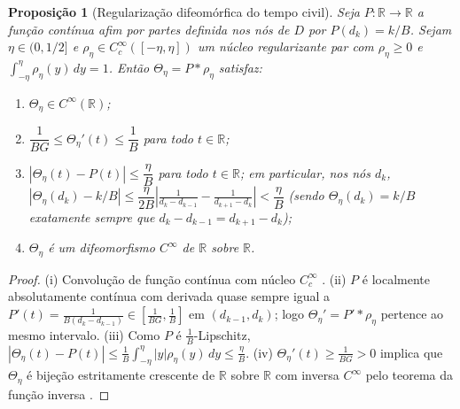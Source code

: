 \documentclass[11pt, a4paper]{article}
\theoremstyle{definition}
\theoremstyle{plain}
\newtheorem{proposicao}[definicao]{Proposição}
\theoremstyle{remark}
\begin{document}
\begin{proposicao}[Regularização difeomórfica do tempo civil]\label{prop:2.2}
Seja $P : \mathbb{R} \to \mathbb{R}$ a função contínua afim por partes definida nos nós de $D$ por $P(d_k) = k/B$. Sejam $\eta \in (0, 1/2]$ e $\rho_\eta \in C_c^\infty([-\eta, \eta])$ um núcleo regularizante par com $\rho_\eta \ge 0$ e $\int_{-\eta}^{\eta} \rho_\eta(y)\,dy = 1$. Então $\Theta_\eta = P * \rho_\eta$ satisfaz:
\begin{enumerate}[label=(\roman*)]
    \item $\Theta_\eta \in C^\infty(\mathbb{R})$;
    \item $\dfrac{1}{BG} \le \Theta_\eta'(t) \le \dfrac{1}{B}$ para todo $t \in \mathbb{R}$;
    \item $|\Theta_\eta(t) - P(t)| \le \dfrac{\eta}{B}$ para todo $t \in \mathbb{R}$; em particular, nos nós $d_k$, $|\Theta_\eta(d_k) - k/B| \le \dfrac{\eta}{2B}\left|\frac{1}{d_k - d_{k-1}} - \frac{1}{d_{k+1} - d_k}\right| < \dfrac{\eta}{B}$ (sendo $\Theta_\eta(d_k) = k/B$ exatamente sempre que $d_k - d_{k-1} = d_{k+1} - d_k$);
    \item $\Theta_\eta$ é um difeomorfismo $C^\infty$ de $\mathbb{R}$ sobre $\mathbb{R}$.
\end{enumerate}
\end{proposicao}
\begin{proof}
(i) Convolução de função contínua com núcleo $C_c^\infty$ \cite[Cap.~4]{Brezis2011}. (ii) $P$ é localmente absolutamente contínua com derivada quase sempre igual a $P'(t) = \frac{1}{B(d_k - d_{k-1})} \in [\frac{1}{BG}, \frac{1}{B}]$ em $(d_{k-1}, d_k)$; logo $\Theta_\eta' = P' * \rho_\eta$ pertence ao mesmo intervalo. (iii) Como $P$ é $\frac{1}{B}$-Lipschitz, $|\Theta_\eta(t) - P(t)| \le \frac{1}{B}\int_{-\eta}^{\eta} |y|\rho_\eta(y)\,dy \le \frac{\eta}{B}$. (iv) $\Theta_\eta'(t) \ge \frac{1}{BG} > 0$ implica que $\Theta_\eta$ é bijeção estritamente crescente de $\mathbb{R}$ sobre $\mathbb{R}$ com inversa $C^\infty$ pelo teorema da função inversa \cite[vol.~2]{LimaAnalise2}.
\end{proof}
\end{document}
